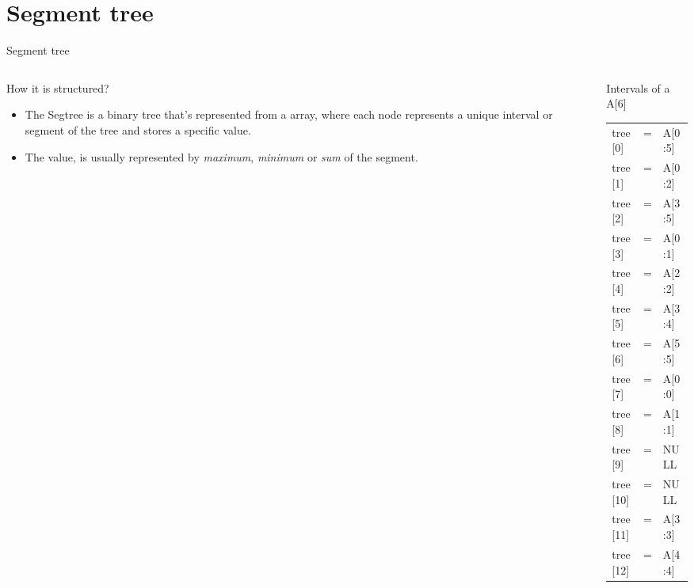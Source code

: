 \documentclass[presentation,12pt]{beamer}
\begin{document}
\section{Segment tree}
\label{sec:orgf9892d7}
\begin{frame}[label={sec:org33dcb1a}]{Segment tree}
\begin{columns}
\begin{column}{0.48\columnwidth}
\begin{block}{How it is structured?}
\begin{itemize}
\item The Segtree is a binary tree that's represented from a array, where each node represents a unique interval or segment of the tree and stores a \alert{specific} value.
\item The value, is usually represented by \emph{maximum}, \emph{minimum} or \emph{sum} of the segment.
\end{itemize}
\end{block}
\end{column}
\begin{column}{0.48\columnwidth}
\begin{block}{Intervals of a A[6]}
\begin{center}
\begin{tabular}{lll}
\hline
tree[0] & = & A[0:5]\\
tree[1] & = & A[0:2]\\
tree[2] & = & A[3:5]\\
tree[3] & = & A[0:1]\\
tree[4] & = & A[2:2]\\
tree[5] & = & A[3:4]\\
tree[6] & = & A[5:5]\\
tree[7] & = & A[0:0]\\
tree[8] & = & A[1:1]\\
tree[9] & = & NULL\\
tree[10] & = & NULL\\
tree[11] & = & A[3:3]\\
tree[12] & = & A[4:4]\\
\hline
\end{tabular}
\end{center}
\end{block}
\end{column}
\end{columns}
\end{frame}
\end{document}
